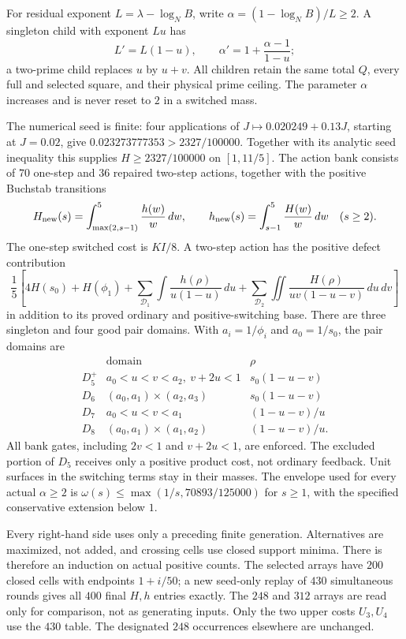For residual exponent $L=\lambda-\log_NB$, write
$\alpha=(1-\log_NB)/L\ge2$.  A singleton child with exponent $Lu$
has
\[
 L'=L(1-u),\qquad \alpha'=1+\frac{\alpha-1}{1-u};
\]
a two-prime child replaces $u$ by $u+v$.  All children retain the
same total $Q$, every full and selected square, and their physical
prime ceiling.  The parameter $\alpha$ increases and is never
reset to $2$ in a switched mass.

The numerical seed is finite: four applications of
$J\mapsto0.020249+0.13J$, starting at $J=0.02$, give
$0.023273777353>2327/100000$.  Together with its analytic seed
inequality this supplies $H\ge2327/100000$ on $[1,11/5]$.
The action bank consists of $70$ one-step and $36$ repaired
two-step actions, together with the positive Buchstab transitions
\[
 H_{\rm new}(s)=\int_{\max(2,s-1)}^5\frac{h(w)}w\,dw,
 \qquad
 h_{\rm new}(s)=\int_{s-1}^5\frac{H(w)}w\,dw\quad(s\ge2).
\]
The one-step switched cost is $KI/8$.  A two-step action has the
positive defect contribution
\begin{equation}
 \frac15\left[4H(s_0)+H(\phi_1)
  +\sum_{\mathcal D_1}\int\frac{h(\rho)}{u(1-u)}\,du
  +\sum_{\mathcal D_2}\iint\frac{H(\rho)}{uv(1-u-v)}\,du\,dv\right]
 \label{eq:current-w2-feedback}
\end{equation}
in addition to its proved ordinary and positive-switching base.
There are three singleton and four good pair domains.  With
$a_i=1/\phi_i$ and $a_0=1/s_0$, the pair domains are
\[
 \begin{array}{c|c|c}
 &\text{domain}&\rho\\ \hline
 D_5^+&a_0<u<v<a_2,\ v+2u<1&s_0(1-u-v)\\
 D_6&(a_0,a_1)\mathbin{\times}(a_2,a_3)&s_0(1-u-v)\\
 D_7&a_0<u<v<a_1&(1-u-v)/u\\
 D_8&(a_0,a_1)\mathbin{\times}(a_1,a_2)&(1-u-v)/u.
 \end{array}
\]
All bank gates, including $2v<1$ and $v+2u<1$, are enforced.
The excluded portion of $D_5$ receives only a positive product cost,
not ordinary feedback.  Unit surfaces in the switching terms stay
in their masses.  The envelope used for every actual $\alpha\ge2$ is
$\omega(s)\le\max(1/s,70893/125000)$ for $s\ge1$, with the
specified conservative extension below $1$.

Every right-hand side uses only a preceding finite generation.
Alternatives are maximized, not added, and crossing cells use closed
support minima.  There is therefore an induction on actual positive
counts.  The selected arrays have $200$ closed cells with endpoints
$1+i/50$; a new seed-only replay of $430$ simultaneous rounds gives
all $400$ final $H,h$ entries exactly.  The $248$ and $312$ arrays
are read only for comparison, not as generating inputs.  Only the
two upper costs $U_3,U_4$ use the $430$ table.  The designated
$248$ occurrences elsewhere are unchanged.

